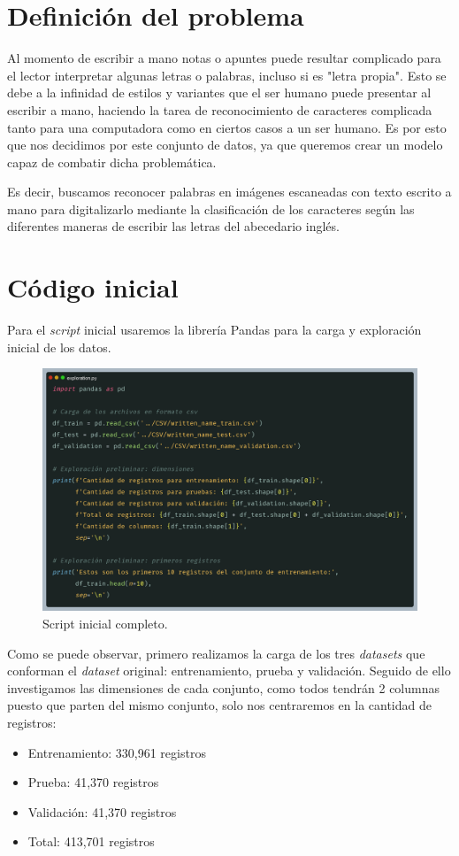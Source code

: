 \documentclass[10pt]{article}
\begin{document}
	\section{Definición del problema}
	Al momento de escribir a mano notas o apuntes puede resultar complicado para el lector interpretar algunas letras o palabras, incluso si es "letra propia". Esto se debe a la infinidad de estilos y variantes que el ser humano puede presentar al escribir a mano, haciendo la tarea de reconocimiento de caracteres complicada tanto para una computadora como en ciertos casos a un ser humano. Es por esto que nos decidimos por este conjunto de datos, ya que queremos crear un modelo capaz de combatir dicha problemática. \par
	Es decir, buscamos reconocer palabras en imágenes escaneadas con texto escrito a mano para digitalizarlo mediante la clasificación de los caracteres según las diferentes maneras de escribir las letras del abecedario inglés.
	
	\section{Código inicial}
	Para el \textit{script} inicial usaremos la librería Pandas para la carga y exploración inicial de los datos. \par
	\begin{figure}[h]
		\centering
		\includegraphics[width=120mm]{./images/script-inicial.jpg}
		\caption{Script inicial completo.}
	\end{figure}
	Como se puede observar, primero realizamos la carga de los tres \textit{datasets} que conforman el \textit{dataset} original: entrenamiento, prueba y validación. Seguido de ello investigamos las dimensiones de cada conjunto, como todos tendrán 2 columnas puesto que parten del mismo conjunto, solo nos centraremos en la cantidad de registros:
	\begin{itemize}
		\item Entrenamiento: 330,961 registros
		\item Prueba: 41,370 registros
		\item Validación: 41,370 registros
		\item Total: 413,701 registros
	\end{itemize}
	
\end{document}
